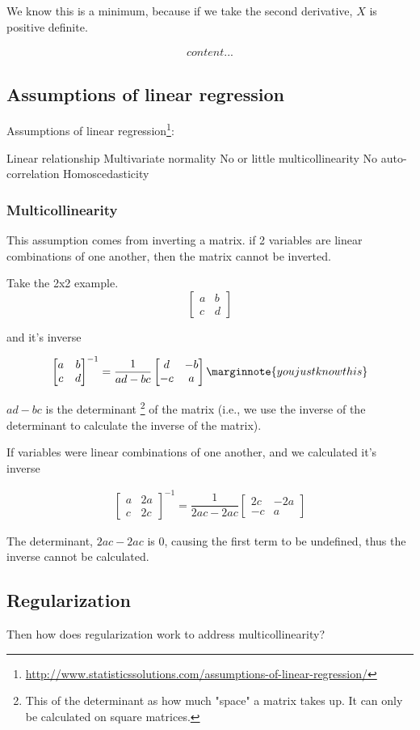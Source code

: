 \documentclass[10pt,letterpaper,twoside]{article}
\begin{document}
We know this is a minimum, because if we take the second derivative,
$X$ is positive definite.

\begin{align}
    content...
\end{align}

\subsection{Assumptions of linear regression}

Assumptions of linear regression\footnote{\url{http://www.statisticssolutions.com/assumptions-of-linear-regression/}}:

Linear relationship
Multivariate normality
No or little multicollinearity
No auto-correlation
Homoscedasticity


\subsubsection{Multicollinearity}

This assumption comes from inverting a matrix.
if 2 variables are linear combinations of one another, then the matrix cannot be inverted.

Take the 2x2 example.
\[
\begin{bmatrix}
    a & b \\
    c & d
\end{bmatrix}
\]

and it's inverse

\begin{align}
    \begin{bmatrix}
    a & b \\
    c & d
    \end{bmatrix}^{-1}
    =
    \dfrac{1}{ad - bc}
    \begin{bmatrix}
    d & -b \\
    -c & a
    \end{bmatrix}    \marginnote{you just know this}
\end{align}

$ad - bc$ is the determinant
\footnote{This of the determinant as how much "space" a matrix takes up.
    It can only be calculated on square matrices.}
of the matrix
(i.e., we use the inverse of the determinant to calculate the inverse of the matrix).

If variables were linear combinations of one another, and we calculated it's inverse

\begin{align}
    \begin{bmatrix}
    a & 2a \\
    c & 2c
    \end{bmatrix}^{-1}
    =
    \dfrac{1}{2ac - 2ac}
    \begin{bmatrix}
    2c & -2a \\
    -c & a
    \end{bmatrix}
\end{align}

The determinant, $2ac - 2ac$ is 0, causing the first term to be undefined,
thus the inverse cannot be calculated.

\subsection{Regularization}

Then how does regularization work to address multicollinearity?
\end{document}
